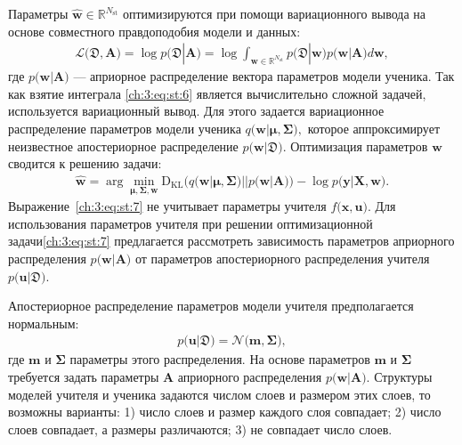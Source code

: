 \documentclass{dissert}
\begin{document}
Параметры $\hat{\mathbf{w}} \in \mathbb{R}^{N_{\text{st}}}$ оптимизируются при помощи вариационного вывода на основе совместного правдоподобия модели и данных:
\[
\label{ch:3:eq:st:6}
\begin{aligned}
\mathcal{L}\bigr(\mathfrak{D}, \mathbf{A}\bigr) = \log p\bigr(\mathfrak{D}|\mathbf{A}\bigr) = \log \int_{\mathbf{w} \in \mathbb{R}^{N_{\text{st}}}}p\bigr(\mathfrak{D}|\mathbf{w}\bigr)p\bigr(\mathbf{w}|\mathbf{A}\bigr)d\mathbf{w},
\end{aligned}
\]
где $p\bigr(\mathbf{w}| \mathbf{A}\bigr)$ --- априорное распределение вектора параметров модели ученика.
Так как взятие интеграла \eqref{ch:3:eq:st:6} является вычислительно сложной задачей, используется вариационный вывод. Для этого задается вариационное распределение параметров модели ученика $q\bigr(\mathbf{w}|\bm{\mu}, \bm{\Sigma}\bigr),$ которое аппроксимирует неизвестное апостериорное распределение $p\bigr(\mathbf{w}|\mathfrak{D}\bigr).$
Оптимизация параметров $\mathbf{w}$ сводится к решению  задачи:
\[
\label{ch:3:eq:st:7}
\begin{aligned}
\hat{\mathbf{w}} = \arg \min_{\bm{\mu}, \bm{\Sigma}, \mathbf{w}} \text{D}_{\text{KL}}\bigr(q\bigr(\mathbf{w}|\bm{\mu}, \bm{\Sigma}\bigr)||p\bigr(\mathbf{w}|\mathbf{A}\bigr)\bigr) - \log p\bigr(\mathbf{y}|\mathbf{X}, \mathbf{w}\bigr).
\end{aligned}
\]
Выражение~\eqref{ch:3:eq:st:7} не учитывает параметры учителя $f\bigr(\mathbf{x}, \mathbf{u}\bigr)$. Для использования параметров учителя при решении оптимизационной задачи\eqref{ch:3:eq:st:7} предлагается рассмотреть зависимость параметров априорного распределения $p\bigr(\mathbf{w}|\mathbf{A}\bigr)$ от параметров апостериорного распределения учителя $p\bigr(\mathbf{u}|\mathfrak{D}\bigr)$.

Апостериорное распределение параметров модели учителя предполагается нормальным:
\[
\label{ch:3:eq:ap:1}
\begin{aligned}
p\bigr(\mathbf{u}|\mathfrak{D}\bigr) = \mathcal{N}\bigr(\mathbf{m}, \bm{\Sigma}\bigr),
\end{aligned}
\]
где $\mathbf{m}$ и $\bm{\Sigma}$ параметры этого распределения. На основе параметров $\mathbf{m}$ и $\bm{\Sigma}$ требуется задать параметры $\mathbf{A}$ априорного распределения $p\bigr(\mathbf{w}|\mathbf{A}\bigr).$
Структуры моделей учителя и ученика задаются числом слоев и размером этих слоев, то возможны варианты: 1) число слоев и размер каждого слоя совпадает; 2) число слоев совпадает, а размеры различаются; 3) не совпадает число слоев.
\end{document}
